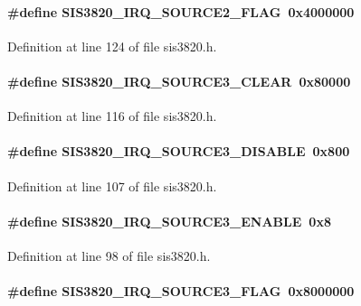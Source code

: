 \paragraph[{SIS3820\_\-IRQ\_\-SOURCE2\_\-FLAG}]{\setlength{\rightskip}{0pt plus 5cm}\#define SIS3820\_\-IRQ\_\-SOURCE2\_\-FLAG~0x4000000}\hfill\label{sis3820_8h_ad4b9625a0b1ccf6ec63ddf3d2898deff}


Definition at line 124 of file sis3820.h.
\paragraph[{SIS3820\_\-IRQ\_\-SOURCE3\_\-CLEAR}]{\setlength{\rightskip}{0pt plus 5cm}\#define SIS3820\_\-IRQ\_\-SOURCE3\_\-CLEAR~0x80000}\hfill\label{sis3820_8h_ab2eefb974cf198ebbaa1a26a748e7779}


Definition at line 116 of file sis3820.h.
\paragraph[{SIS3820\_\-IRQ\_\-SOURCE3\_\-DISABLE}]{\setlength{\rightskip}{0pt plus 5cm}\#define SIS3820\_\-IRQ\_\-SOURCE3\_\-DISABLE~0x800}\hfill\label{sis3820_8h_a756b24f939b3488aab0216c60b610251}


Definition at line 107 of file sis3820.h.
\paragraph[{SIS3820\_\-IRQ\_\-SOURCE3\_\-ENABLE}]{\setlength{\rightskip}{0pt plus 5cm}\#define SIS3820\_\-IRQ\_\-SOURCE3\_\-ENABLE~0x8}\hfill\label{sis3820_8h_a6e771c9d0e1a6a23ffbefb8f1db71517}


Definition at line 98 of file sis3820.h.
\paragraph[{SIS3820\_\-IRQ\_\-SOURCE3\_\-FLAG}]{\setlength{\rightskip}{0pt plus 5cm}\#define SIS3820\_\-IRQ\_\-SOURCE3\_\-FLAG~0x8000000}\hfill\label{sis3820_8h_aea27b0a1a2d9ef861cb87a968c3687e9}


